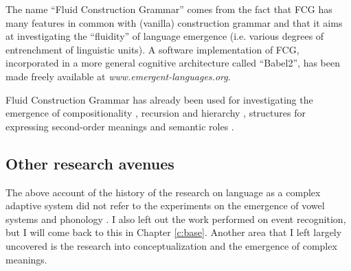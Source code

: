 The name ``Fluid Construction Grammar'' comes from the fact that FCG has many features in common with (vanilla) construction grammar \citep{croft05logical} and that it aims at investigating the ``fluidity'' of language emergence (i.e. various degrees of entrenchment of linguistic units). A software implementation of FCG, incorporated in a more general cognitive architecture called ``Babel2'', has been made freely available at {\em www.emergent-languages.org}.

Fluid Construction Grammar has already been used for investigating the emergence of compositionality \citep{debeule06emergence}, recursion and hierarchy \citep{bleys08recursive, debeule07compositionality, debeule08emergence}, structures for expressing second-order meanings \citep{steels05planning} and semantic roles \citep{steels04constructivist, vantrijp08emergence}.

\subsection{Other research avenues}
\label{s:other}

The above account of the history of the research on language as a complex adaptive system did not refer to the experiments on the emergence of vowel systems and phonology \citep{deboer00self, oudeyer05self-organization}. I also left out the work performed on event recognition, but I will come back to this in Chapter \ref{c:base}. Another area that I left largely uncovered is the research into conceptualization and the emergence of complex meanings.

